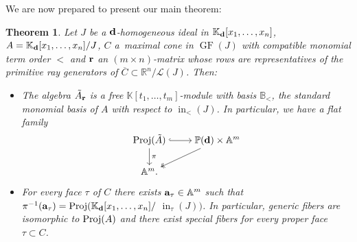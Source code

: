\documentclass[10pt,a4paper]{amsart}
\newcommand{\thlabel}[1]{\label{#1}}
\newtheorem{Theorem}{Theorem}[section]
\numberwithin{equation}{section}
\DeclareMathOperator{\init}{in}
\DeclareMathOperator{\GF}{GF}
\begin{document}
We are now prepared to present our main theorem:


\begin{Theorem}\thlabel{thm:family}
Let $J$ be a ${\bf d}$-homogeneous ideal in $\mathbb K_{\bf d}[x_1,\dots,x_n]$, $A=\mathbb K_{\bf d}[x_1,\ldots,x_n]/J$, $C$ a~maximal cone in $\GF(J)$ with compatible monomial term order $<$ and ${\bf r}$ an $(m\times n)$-matrix whose rows are representatives of the primitive ray generators of $\overline{C}\subset \mathbb R^n/\mathcal L(J)$. Then:
\begin{itemize}\itemsep=0pt
 \item[$(i)$] The algebra $\tilde A_{\bf r}$ is a free $\mathbb K[t_1,\dots,t_m]$-module with basis $\mathbb B_<$, the standard monomial basis of $A$ with respect to $\init_<(J)$.
 In particular, we have a flat family
 \begin{displaymath}
 \begin{tikzcd}[ampersand replacement=\&,cramped]
 {\rm Proj}(\tilde A) \ar[r,hook]\ar[d,"\pi"] \& \mathbb P({\bf d})\times \mathbb A^m \ar[ld,twoheadrightarrow]\\
 \mathbb A^m. \&
 \end{tikzcd}
 \end{displaymath}
\item[$(ii)$] For every face $\tau$ of $C$ there exists ${\bf a}_\tau\in \mathbb A^m$ such that
 $\pi^{-1}({\bf a}_\tau) = {\rm Proj}(\mathbb K_{\bf d}[x_1,\dots,x_n]/$ $\init_\tau(J))$.
 In particular, generic fibers are isomorphic to ${\rm Proj}(A)$ and there exist special fibers for every proper face $\tau\subset C$.
\end{itemize}
\end{Theorem}
\end{document}
